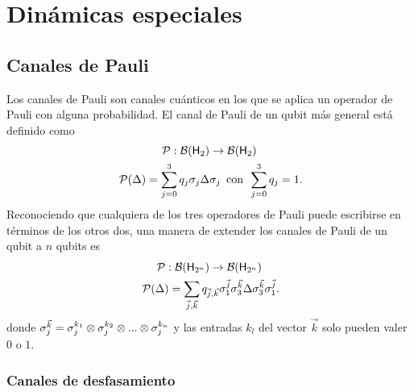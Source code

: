 \section{Dinámicas especiales}

\subsection{Canales de Pauli}

Los canales de Pauli son canales cuánticos en los que se aplica un operador de Pauli con alguna probabilidad. El canal de Pauli de un qubit más general está definido como
\begin{gather}
    \mcP:\mcB(\hilbert_{2}) \rightarrow \mcB(\hilbert_{2})\nonumber\\
    \mcP(\Delta)=\sum_{j=0}^{3}q_{j}\pauli{j}\Delta\pauli{j}\,\text{ con }\, \sum_{j=0}^{3}q_{j}=1\rlap{.}\nonumber
\end{gather}
Reconociendo que cualquiera de los tres operadores de Pauli puede escribirse en términos de los otros dos, una manera de extender los canales de Pauli de un qubit a $n$ qubits es \cite{NPauliOperators}
\begin{equation}\label{eq:PauliChannelN}
    \begin{gathered}
        \mcP:\mcB(\hilbert_{2^{n}}) \rightarrow \mcB(\hilbert_{2^{n}})\\
        \mcP(\Delta)=\sum_{\vec{j},\vec{k}}q_{\vec{j},\vec{k}}\pauli{1}^{\vec{j}}\pauli{3}^{\vec{k}}\Delta\pauli{3}^{\vec{k}}\pauli{1}^{\vec{j}}\rlap{.}
    \end{gathered}
\end{equation}
donde $\sigma_{j}^{\vec{k}}=\sigma_{j}^{k_{1}}\otimes\sigma_{j}^{k_{2}}\otimes ... \otimes \sigma_{j}^{k_{n}}$ y las entradas $k_{l}$ del vector $\vec{k}$ solo pueden valer $0$ o $1$.

\subsubsection{Canales de desfasamiento}

